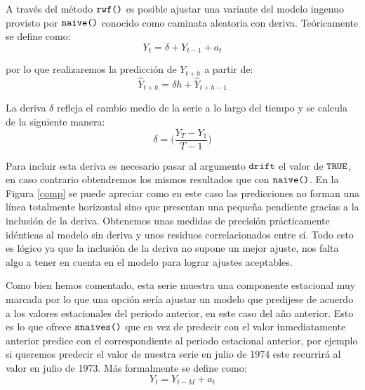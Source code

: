 A través del método $\verb!rwf()!$ es posible ajustar una variante del modelo ingenuo provisto por $\verb!naive()!$ conocido como caminata aleatoria con deriva. Teóricamente se define como:
\begin{equation}
    Y_t = \delta + Y_{t - 1} + a_t
\end{equation}

\noindent por lo que realizaremos la predicción de $Y_{t + h}$ a partir de:
\begin{equation}
    \widehat{Y}_{t + h} = \delta h + \widehat{Y}_{t + h - 1}
\end{equation}

La deriva $\delta$ refleja el cambio medio de la serie a lo largo del tiempo y se calcula de la siguiente manera:
\begin{equation}
    \delta = \bigg( \frac{Y_T - Y_1}{T - 1} \bigg)
\end{equation}

Para incluir esta deriva es necesario pasar al argumento $\verb!drift!$ el valor de $\verb!TRUE!$, en caso contrario obtendremos los mismos resultados que con $\verb!naive()!$. En la Figura \ref{comp} se puede apreciar como en este caso las predicciones no forman una línea totalmente horizontal sino que presentan una pequeña pendiente gracias a la inclusión de la deriva. Obtenemos unas medidas de precisión prácticamente idénticas al modelo sin deriva y unos residuos correlacionados entre sí. Todo esto es lógico ya que la inclusión de la deriva no supone un mejor ajuste, nos falta algo a tener en cuenta en el modelo para lograr ajustes aceptables.

Como bien hemos comentado, esta serie muestra una componente estacional muy marcada por lo que una opción sería ajustar un modelo que predijese de acuerdo a los valores estacionales del periodo anterior, en este caso del año anterior. Esto es lo que ofrece $\verb!snaives()!$ que en vez de predecir con el valor inmediatamente anterior predice con el correspondiente al periodo estacional anterior, por ejemplo si queremos predecir el valor de nuestra serie en julio de 1974 este recurrirá al valor en julio de 1973. Más formalmente se define como:
\begin{equation}
    Y_t = Y_{t - M} + a_t
\end{equation}

